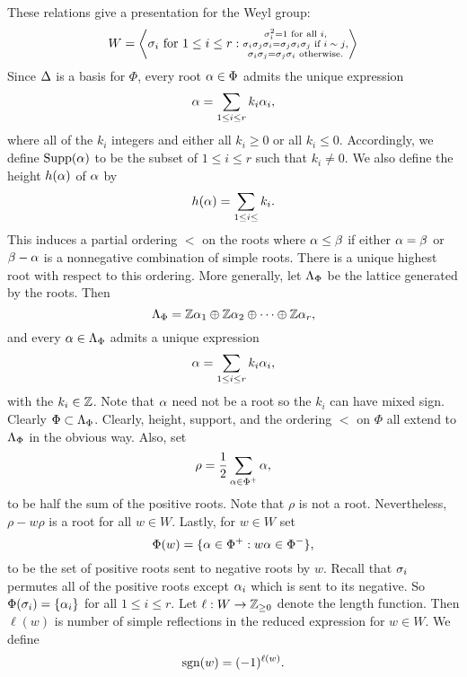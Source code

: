 \documentclass[12pt,reqno,oneside]{amsart}
\begin{document}
        These relations give a presentation for the Weyl group:
        \[
            W = \left\langle \sigma_{i} \text{ for } 1 \le i \le r: \substack{\sigma_{i}^{2} = 1 \text{ for all $i$}, \\ \sigma_{i}\sigma_{j}\sigma_{i} = \sigma_{j}\sigma_{i}\sigma_{j} \text{ if $i \sim j$}, \\ \sigma_{i}\sigma_{j} = \sigma_{j}\sigma_{i} \text{ otherwise}.} \right\rangle
        \]
        Since $\Delta$ is a basis for $\Phi$, every root $\alpha \in \Phi$ admits the unique expression
        \[
            \alpha = \sum_{1 \le i \le r}k_{i}\alpha_{i},
        \]
        where all of the $k_{i}$ integers and either all $k_{i} \ge 0$ or all $k_{i} \le 0$. Accordingly, we define $\operatorname{\mathrm{Supp}}(\alpha)$ to be the subset of $1 \le i \le r$ such that $k_{i} \neq 0$. We also define the height $h(\alpha)$ of $\alpha$ by
        \[
            h(\alpha) = \sum_{1 \le i \le }k_{i}.
        \]
        This induces a partial ordering $<$ on the roots where $\alpha \le \beta$ if either $\alpha = \beta$ or $\beta-\alpha$ is a nonnegative combination of simple roots. There is a unique highest root with respect to this ordering. More generally, let $\Lambda_{\Phi}$ be the lattice generated by the roots. Then
        \[
            \Lambda_{\Phi} = \mathbb{Z}\alpha_{1} \oplus \mathbb{Z}\alpha_{2} \oplus \cdots \oplus \mathbb{Z}\alpha_{r},
        \]
        and every $\alpha \in \Lambda_{\Phi}$ admits a unique expression
        \[
            \alpha = \sum_{1 \le i \le r}k_{i}\alpha_{i},
        \]
        with the $k_{i} \in \mathbb{Z}$. Note that $\alpha$ need not be a root so the $k_{i}$ can have mixed sign. Clearly $\Phi \subset \Lambda_{\Phi}$. Clearly, height, support, and the ordering $<$ on $\Phi$ all extend to $\Lambda_{\Phi}$ in the obvious way. Also, set
        \[
            \rho = \frac{1}{2}\sum_{\alpha \in \Phi^{+}}\alpha,
        \]
        to be half the sum of the positive roots. Note that $\rho$ is not a root. Nevertheless, $\rho-w\rho$ is a root for all $w \in W$. Lastly, for $w \in W$ set
        \[
            \Phi(w) = \{\alpha \in \Phi^{+}:w\alpha \in \Phi^{-}\},
        \]
        to be the set of positive roots sent to negative roots by $w$. Recall that $\sigma_{i}$ permutes all of the positive roots except $\alpha_{i}$ which is sent to its negative. So $\Phi(\sigma_{i}) = \{\alpha_{i}\}$ for all $1 \le i \le r$. Let $\ell:W \to \mathbb{Z}_{\ge 0}$ denote the length function. Then $\ell(w)$ is number of simple reflections in the reduced expression for $w \in W$. We define
        \[
            \operatorname{\mathrm{sgn}}(w) = (-1)^{\ell(w)}.
        \]
\end{document}
